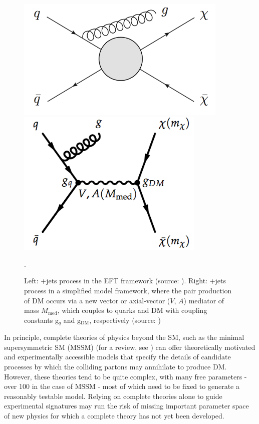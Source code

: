 \begin{figure}[h]
	\centering
	\begin{minipage}[b]{0.45\textwidth}
	\includegraphics[width=0.9\textwidth]{Figures/1/EFT_Signature.png}
	\end{minipage}
	\begin{minipage}[b]{0.45\textwidth}
	\includegraphics[width=0.8\textwidth]{Figures/1/simplified_model.png}
	\end{minipage}
	\caption[]{Left: \met+jets process in the EFT framework (source: \cite{beyond_eft}). Right: \met+jets process in a simplified model framework, where the pair production of DM occurs via a new vector or axial-vector ($V$, $A$) mediator of mass $M_\text{med}$, which couples to quarks and DM with coupling constants g$_q$ and g$_\text{DM}$, respectively (source: \cite{dm_forum})}.
	\label{fig:eft_simplified_model}
\end{figure}

In principle, complete theories of physics beyond the SM, such as the minimal supersymmetric SM (MSSM) (for a review, see \cite{mssm}) can offer theoretically motivated and experimentally accessible models that specify the details of candidate processes by which the colliding partons may annihilate to produce DM. However, these theories tend to be quite complex, with many free parameters - over 100 in the case of MSSM \cite{DM_colliders} - most of which need to be fixed to generate a reasonably testable model. Relying on complete theories alone to guide experimental signatures may run the risk of missing important parameter space of new physics for which a complete theory has not yet been developed. 

